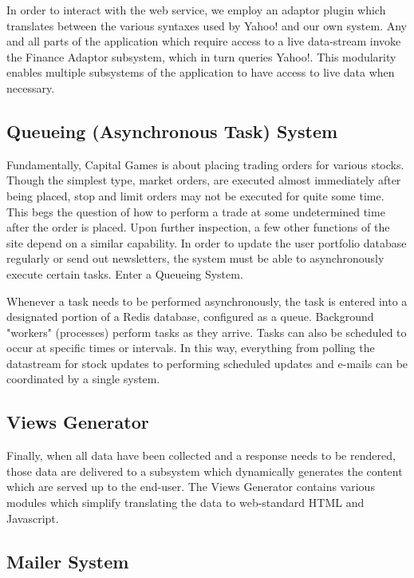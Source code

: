 In order to interact with the web service, we employ an adaptor plugin which
translates between the various syntaxes used by Yahoo! and our own system.
Any and all parts of the application which require access to a live data-stream
invoke the Finance Adaptor subsystem, which in turn queries Yahoo!. This
modularity enables multiple subsystems of the application to have access to live data
when necessary.

\subsection{Queueing (Asynchronous Task) System}

Fundamentally, Capital Games is about placing trading orders for various stocks. 
Though the simplest type, market orders, are executed almost immediately after being 
placed, stop and limit orders may not be executed for quite some time. \cite{inv:market}
\cite{inv:stop} \cite{inv:limit} This begs the question of how to perform a trade
at some undetermined time after the order is placed. 
Upon further inspection, a few other functions of the site depend on a similar capability.
In order to update the user portfolio database regularly or send out newsletters, the system 
must be able to asynchronously execute certain tasks. Enter a Queueing System.

Whenever a task needs to be performed asynchronously, the task is entered into a 
designated portion of a Redis database, configured as a queue. Background "workers" 
(processes) perform tasks as they arrive. Tasks can also be scheduled to occur at specific
times or intervals. In this way, everything from polling the datastream for stock updates
to performing scheduled updates and e-mails can be coordinated by a single system.

\subsection{Views Generator}

Finally, when all data have been collected and a response needs to be rendered, those data
are delivered to a subsystem which dynamically generates the content
which are served up to the end-user. The Views Generator contains various modules which
simplify translating the data to web-standard HTML and Javascript.

\subsection{Mailer System}

